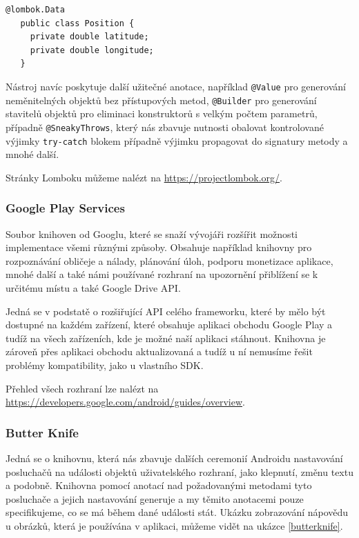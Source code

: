 \documentclass[czech,master,public,dept460,male,java,cpdeclaration]{diploma}
\begin{document}
\begin{lstlisting}[label=lombokshowcase,caption=Datová třída používající Lombok]
   @lombok.Data
   public class Position {
     private double latitude;
     private double longitude;
   }
\end{lstlisting}

Nástroj navíc poskytuje další užitečné anotace, například \texttt{@Value} pro generování neměnitelných objektů
bez přístupových metod, \texttt{@Builder} pro generování stavitelů objektů pro eliminaci konstruktorů s velkým
počtem parametrů, případně \texttt{@SneakyThrows}, který nás zbavuje nutnosti obalovat kontrolované výjimky
\texttt{try-catch} blokem případně výjimku propagovat do signatury metody a mnohé další.

Stránky Lomboku můžeme nalézt na \url{https://projectlombok.org/}.

\subsubsection{Google Play Services}
Soubor knihoven od Googlu, které se snaží vývojáři rozšířit možnosti implementace všemi různými způsoby.
Obsahuje například knihovny pro rozpoznávání obličeje a nálady, plánování úloh, podporu monetizace aplikace,
mnohé další a také námi používané rozhraní na upozornění přiblížení se k určitému místu a také Google Drive API.

Jedná se v podstatě o rozšiřující API celého frameworku, které by mělo být dostupné na každém zařízení, které
obsahuje aplikaci obchodu Google Play a tudíž na všech zařízeních, kde je možné naší aplikaci stáhnout.
Knihovna je zároveň přes aplikaci obchodu aktualizovaná a tudíž u ní nemusíme řešit problémy
kompatibility, jako u vlastního SDK. \cite{gms}

Přehled všech rozhraní lze nalézt na \url{https://developers.google.com/android/guides/overview}.

\subsubsection{Butter Knife}
Jedná se o knihovnu, která nás zbavuje dalších ceremonií Androidu nastavování posluchačů
na události objektů uživatelského rozhraní, jako klepnutí, změnu textu a podobně. Knihovna pomocí
anotací nad požadovanými metodami tyto posluchače a jejich nastavování generuje a my těmito anotacemi
pouze specifikujeme, co se má během dané události stát. Ukázku zobrazování nápovědu u obrázků, která je
používána v aplikaci, můžeme vidět na ukázce \ref{butterknife}.
\end{document}
